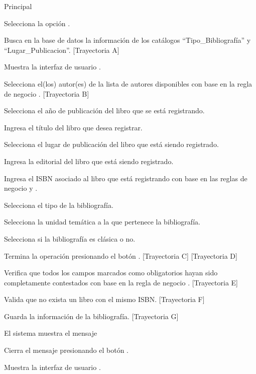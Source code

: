 \begin{UCtrayectoria}{Principal}

    \UCpaso[\UCactor] Selecciona la opción .

    \UCpaso Busca en la base de datos la información de los catálogos ``Tipo\_Bibliografía'' y ``Lugar\_Publicacion''. [Trayectoria A]

    \UCpaso Muestra la interfaz de usuario .

    \UCpaso[\UCactor] Selecciona el(los) autor(es) de la lista de autores disponibles con base en la regla de negocio . [Trayectoria B]
    
    \UCpaso[\UCactor] Selecciona el año de publicación del libro que se está registrando.
    
    \UCpaso[\UCactor] Ingresa el título del libro que desea registrar.
    
    \UCpaso[\UCactor] Selecciona el lugar de publicación del libro que está siendo registrado.
    
    \UCpaso[\UCactor] Ingresa la editorial del libro que está siendo registrado.

    \UCpaso[\UCactor] Ingresa el ISBN asociado al libro que está registrando con base en las reglas de negocio  y .

    \UCpaso[\UCactor] Selecciona el tipo de la bibliografía.
    
    \UCpaso[\UCactor] Selecciona la unidad temática a la que pertenece la bibliografía.

    \UCpaso[\UCactor] Selecciona si la bibliografía es clásica o no.
    
    \UCpaso[\UCactor] Termina la operación presionando el botón . [Trayectoria C] [Trayectoria D]

    \UCpaso Verifica que todos los campos marcados como obligatorios hayan sido completamente contestados con base en la regla de negocio . [Trayectoria E]

    \UCpaso Valida que no exista un libro con el mismo ISBN. [Trayectoria F]

    \UCpaso Guarda la información de la bibliografía. [Trayectoria G]

    \UCpaso El sistema muestra el mensaje 

    \UCpaso[\UCactor] Cierra el mensaje presionando el botón .

    \UCpaso Muestra la interfaz de usuario .
\end{UCtrayectoria}

